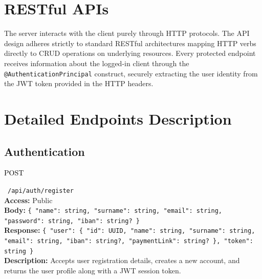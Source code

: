 
\newcommand{\apiGET}{\colorbox{MethGet}{\textcolor{black}{\small\ttfamily\bfseries\strut GET}}}
\newcommand{\apiPOST}{\colorbox{MethPost}{\textcolor{black}{\small\ttfamily\bfseries\strut POST}}}
\newcommand{\apiPUT}{\colorbox{MethPut}{\textcolor{black}{\small\ttfamily\bfseries\strut PUT}}}
\newcommand{\apiDELETE}{\colorbox{MethDelete}{\textcolor{black}{\small\ttfamily\bfseries\strut DELETE}}}
\newcommand{\apiPATCH}{\colorbox{MethPatch}{\textcolor{black}{\small\ttfamily\bfseries\strut PATCH}}}

\section{RESTful APIs}
The server interacts with the client purely through HTTP protocols. The API design adheres strictly to standard RESTful architectures mapping HTTP verbs directly to CRUD operations on underlying resources. Every protected endpoint receives information about the logged-in client through the \texttt{@AuthenticationPrincipal} construct, securely extracting the user identity from the JWT token provided in the HTTP headers.

\section{Detailed Endpoints Description} 

\subsection{Authentication}

\vspace{0.3cm}
\noindent \apiPOST\ \texttt{/api/auth/register} \\
\textbf{Access:} Public \\
\textbf{Body:} \texttt{\{ "name": string, "surname": string, "email": string, "password": string, "iban": string? \}} \\
\textbf{Response:} \texttt{\{ "user": \{ "id": UUID, "name": string, "surname": string, "email": string, "iban": string?, "paymentLink": string? \}, "token": string \}} \\
\textbf{Description:} Accepts user registration details, creates a new account, and returns the user profile along with a JWT session token.

